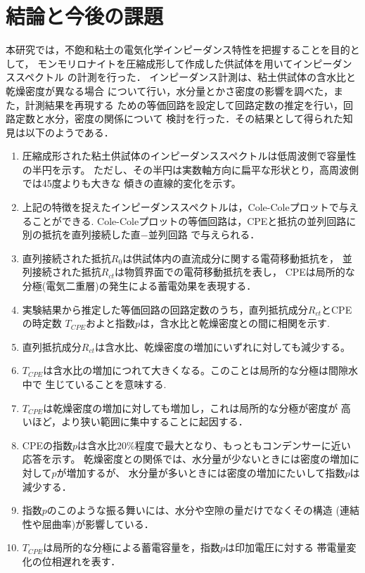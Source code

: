 ﻿\documentclass[11pt,a4j]{mybook2}
\begin{document}
\chapter{結論と今後の課題}
本研究では，不飽和粘土の電気化学インピーダンス特性を把握することを目的として，
モンモリロナイトを圧縮成形して作成した供試体を用いてインピーダンススペクトル
の計測を行った． インピーダンス計測は、粘土供試体の含水比と乾燥密度が異なる場合
について行い，水分量とかさ密度の影響を調べた，また，計測結果を再現する
ための等価回路を設定して回路定数の推定を行い，回路定数と水分，密度の関係について
検討を行った．その結果として得られた知見は以下のようである．
\begin{enumerate}
\item
        圧縮成形された粘土供試体のインピーダンススペクトルは低周波側で容量性の半円を示す。
        ただし、その半円は実数軸方向に扁平な形状とり，高周波側では45度よりも大きな
	傾きの直線的変化を示す。
\item
	上記の特徴を捉えたインピーダンススペクトルは，Cole-Coleプロットで与えることができる.
	Cole-Coleプロットの等価回路は，CPEと抵抗の並列回路に別の抵抗を直列接続した直−並列回路
	で与えられる．
\item
	直列接続された抵抗$R_{0}$は供試体内の直流成分に関する電荷移動抵抗を，
	並列接続された抵抗$R_{ct}$は物質界面での電荷移動抵抗を表し，
	CPEは局所的な分極(電気二重層)の発生による蓄電効果を表現する．
\item
	実験結果から推定した等価回路の回路定数のうち，直列抵抗成分$R_{ct}$とCPEの時定数
	$T_{CPE}$およと指数$p$は，含水比と乾燥密度との間に相関を示す.
\item
        直列抵抗成分$R_{ct}$は含水比、乾燥密度の増加にいずれに対しても減少する。
\item
        $T_{CPE}$は含水比の増加につれて大きくなる。このことは局所的な分極は間隙水中で
	生じていることを意味する.
\item
        $T_{CPE}$は乾燥密度の増加に対しても増加し，これは局所的な分極が密度が
	高いほど，より狭い範囲に集中することに起因する．
\item
        CPEの指数$p$は含水比$20\%$程度で最大となり、もっともコンデンサーに近い応答を示す。
        乾燥密度との関係では、水分量が少ないときには密度の増加に対して$p$が増加するが、
        水分量が多いときには密度の増加にたいして指数$p$は減少する．
\item
        指数$p$のこのような振る舞いには、水分や空隙の量だけでなくその構造
	(連結性や屈曲率)が影響している．
\item
        $T_{CPE}$は局所的な分極による蓄電容量を，指数$p$は印加電圧に対する
	帯電量変化の位相遅れを表す．
\end{enumerate}
\end{document}
